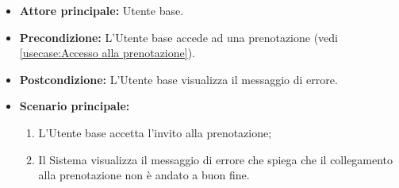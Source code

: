 \label{usecase:Accesso prenotazione fallito}
\begin{itemize}
	\item \textbf{Attore principale:} Utente base.

	\item \textbf{Precondizione:}
	      L'Utente base accede ad una prenotazione (vedi \autoref{usecase:Accesso alla prenotazione}).

	\item \textbf{Postcondizione:}
	      L'Utente base visualizza il messaggio di errore.

	\item \textbf{Scenario principale:}
	      \begin{enumerate}
		      \item L'Utente base accetta l'invito alla prenotazione;

		      \item Il Sistema visualizza il messaggio di errore che spiega che il collegamento alla prenotazione non è andato a buon fine.
	      \end{enumerate}
\end{itemize}